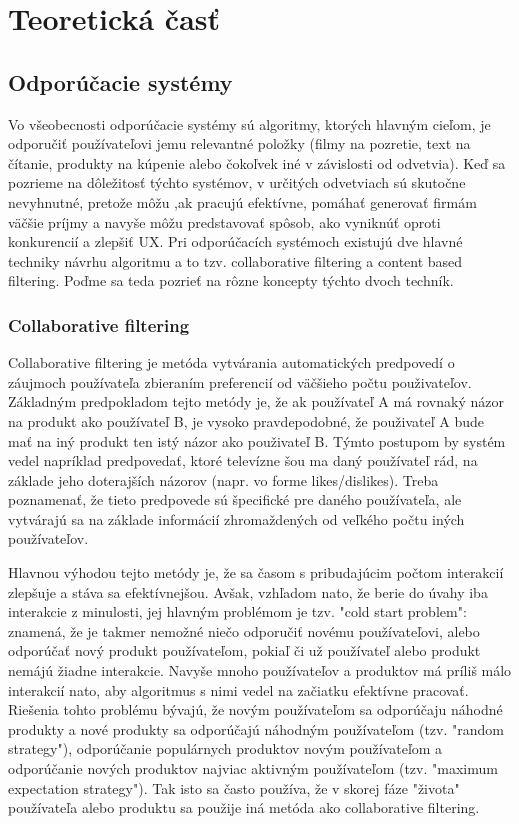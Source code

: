 \section{Teoretická časť}

\subsection{Odporúčacie systémy}
 Vo všeobecnosti odporúčacie systémy sú algoritmy, ktorých hlavným cieľom, je odporučiť používateľovi jemu relevantné položky (filmy na pozretie, text na čítanie, produkty na kúpenie alebo čokoľvek iné v závislosti od odvetvia). Keď sa pozrieme na dôležitosť týchto systémov, v určitých odvetviach sú skutočne nevyhnutné, pretože môžu ,ak pracujú efektívne, pomáhať generovať firmám väčšie príjmy a navyše môžu predstavovať spôsob, ako vyniknúť oproti konkurencií a zlepšiť UX. Pri odporúčacích systémoch existujú dve hlavné techniky návrhu algoritmu a to tzv. collaborative filtering a content based filtering. Poďme sa teda pozrieť na rôzne koncepty týchto dvoch techník. \\

\subsubsection{Collaborative filtering}
Collaborative filtering je metóda vytvárania automatických predpovedí o záujmoch používateľa zbieraním preferencií od väčšieho počtu použivateľov. Základným predpokladom tejto metódy je, že ak používateľ A má rovnaký názor na produkt ako používateľ B, je vysoko pravdepodobné, že použivateľ A bude mať na iný produkt ten istý názor ako použivateľ B. Týmto postupom by systém vedel napríklad predpovedať, ktoré televízne šou ma daný používateľ rád, na základe jeho doterajších názorov (napr. vo forme likes/dislikes). Treba poznamenať, že tieto predpovede sú špecifické pre daného používateľa, ale vytvárajú sa na základe informácií zhromaždených od veľkého počtu iných používateľov. 

Hlavnou výhodou tejto metódy je, že sa časom s pribudajúcim počtom interakcií zlepšuje a stáva sa efektívnejšou. Avšak, vzhľadom nato, že berie do úvahy iba interakcie z minulosti, jej hlavným problémom je tzv. "cold start problem": znamená, že je takmer nemožné niečo odporučiť novému používateľovi, alebo odporúčať nový produkt používateľom, pokiaľ či už používateľ alebo produkt nemájú žiadne interakcie. Navyše mnoho používateľov a produktov má príliš málo interakcií nato, aby algoritmus s nimi vedel na začiatku efektívne pracovať. Riešenia tohto problému bývajú, že novým používateľom sa odporúčaju náhodné produkty a nové produkty sa odporúčajú náhodným používateľom (tzv. "random strategy"), odporúčanie populárnych produktov novým používateľom a odporúčanie nových produktov najviac aktivným používateľom (tzv. "maximum expectation strategy"). Tak isto sa často používa, že v skorej fáze "života" používateľa alebo produktu sa použije iná metóda ako collaborative filtering. \\\\


